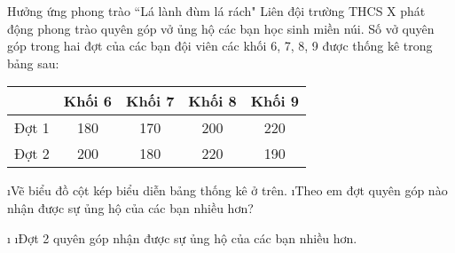 \begin{bt}
	Hưởng ứng phong trào  ``Lá lành đùm lá rách" Liên đội trường THCS X phát động phong trào quyên góp vở ủng hộ các bạn học sinh miền núi. Số vở quyên góp trong hai đợt của các bạn đội viên các khối 6, 7, 8, 9 được thống kê trong bảng sau:
	\begin{center}
		\begin{tabular}{|c|c|c|c|c|}
			\hline
			&Khối 6&	Khối 7&	Khối 8&	Khối 9\\
			\hline
			Đợt 1&	180&	170&	200&	220\\
			\hline
			Đợt 2&	200&	180&	220&	190\\
			\hline
		\end{tabular}
	\end{center}
	\begin{enumerate}[a),leftmargin=*]
		\i Vẽ biểu đồ cột kép biểu diễn bảng thống kê ở trên.
		\i Theo em đợt quyên góp nào nhận được sự ủng hộ của các bạn nhiều hơn?
	\end{enumerate}
	\begin{loigiaichuong40}
		\begin{enumerate}[a),leftmargin=*]
			\i
			\i Đợt 2 quyên góp nhận được sự ủng hộ của các bạn nhiều hơn.
		\end{enumerate}
	\end{loigiaichuong40}
\end{bt}
